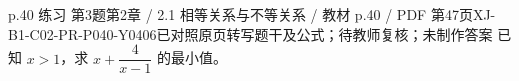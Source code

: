 \par\noindent\begin{minipage}{\linewidth}
\begin{bankitem}{p.40 练习 第3题}{第2章 / 2.1 相等关系与不等关系 / 教材 p.40 / PDF 第47页}{XJ-B1-C02-PR-P040-Y0406}{已对照原页转写题干及公式；待教师复核；未制作答案}
已知 $x>1$，求 $x+\dfrac4{x-1}$ 的最小值。
\end{bankitem}
\end{minipage}\par\medskip
